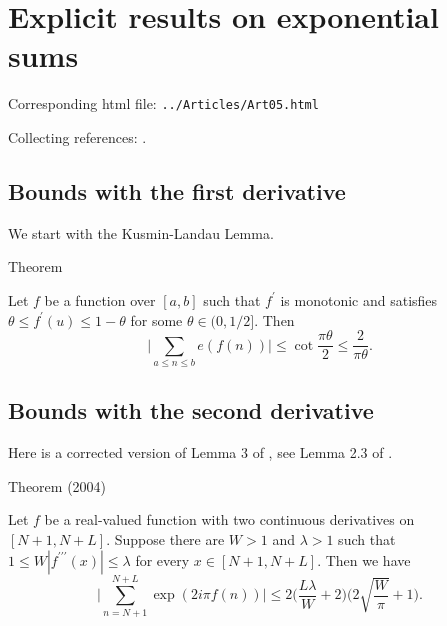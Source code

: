\chapter{   Explicit results on exponential sums}

Corresponding html file: \texttt{../Articles/Art05.html}










Collecting references:
\cite{Daboussi-Rivat*01}.



 
 


\par 
\section{Bounds with the first derivative}


We start with the Kusmin-Landau Lemma.
\par 
\begin{thm}{Theorem}

    Let $f$ be a function over $[a, b]$ such that $f^\prime$ is monotonic
    and satisfies $\theta \le f^\prime(u)\le 1-\theta$ for some $\theta
    \in(0,1/2]$. Then
    $$
    \biggl|\sum_{a\le n\le b} e(f(n))\biggr|
    \le
    \cot\frac{\pi\theta}{2}\le \frac{2}{\pi \theta}.
    $$
\end{thm}



\par 
\section{Bounds with the second derivative}


  Here is a corrected version of Lemma 3 of
  \cite{Cheng-Graham*01},
  see Lemma 2.3 of
  \cite{Patel*22}.
\par 
\begin{thm}{Theorem (2004)}

  Let $f$ be a real-valued function with two continuous derivatives
  on $[N+1, N+L]$. Suppose there are $W > 1$ and $\lambda > 1$ such
  that $1 \le W |f^{\prime\prime\prime}(x)| \le \lambda$ for every $x\in [N+1,
  N+L]$. Then we have
  $$
  \biggl|\sum_{n= N+1}^{N+L}
  \exp( 2i\pi f(n)) \biggr|
  \le 2\biggl(\frac{L \lambda}{W} +2\biggr)
  \biggl(2\sqrt{\frac{W}{\pi}} + 1\biggr).
  $$
\end{thm}



